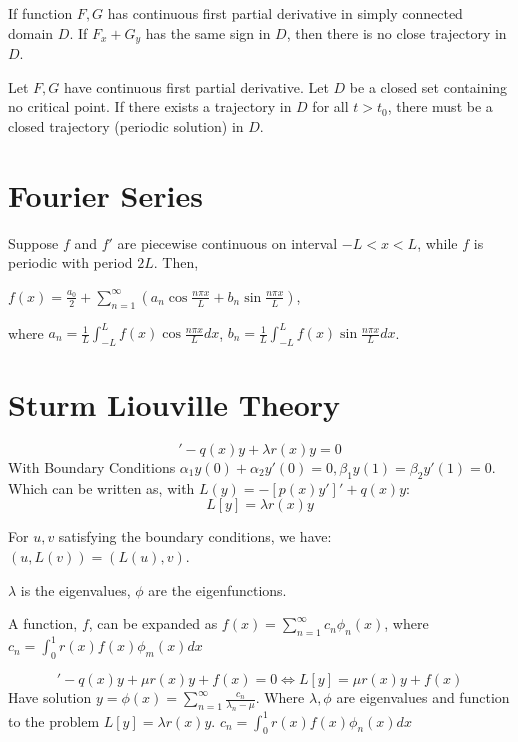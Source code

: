 \documentclass[12pt]{article}
\begin{document}
\begin{theorem}
If function $F, G$ has continuous first partial derivative in simply connected domain $D$. If $F_x + G_y$ has the same sign in $D$, then there is no close trajectory in $D$.
\end{theorem}

\begin{theorem}
	Let $F,G$ have continuous first partial derivative. Let $D$ be a closed set containing no critical point. If there exists a trajectory in $D$ for all $t>t_0$, there must be a closed trajectory (periodic solution) in $D$.
\end{theorem}

\section{Fourier Series}
\begin{theorem}
	Suppose $f$ and $f'$ are piecewise continuous on interval $-L < x < L$, while $f$ is periodic with period $2L$. Then,

	$f(x) = \frac{a_0}{2} + \sum_{n=1}^{\infty} (a_n \cos{\frac{n\pi x}{L}} + b_n \sin{\frac{n\pi x}{L}})$,

	where $a_n = \frac{1}{L} \int_{-L}^{L} f(x) \cos{\frac{n\pi x}{L}} dx$, $b_n = \frac{1}{L} \int_{-L}^{L} f(x) \sin{\frac{n\pi x}{L}} dx$.
\end{theorem}

\section{Sturm Liouville Theory}

\begin{theorem} 
	\begin{equation}
		[p(x)y']' - q(x)y + \lambda r(x) y = 0
	\end{equation}
	With Boundary Conditions $\alpha_1 y(0) + \alpha_2 y'(0) = 0, \beta_1 y(1) = \beta_2 y'(1) = 0$.
	Which can be written as, with $L(y) = -[p(x)y']' + q(x)y$:
	$$L[y] = \lambda r(x)y$$

	For $u,v$ satisfying the boundary conditions, we have: $(u, L(v)) = (L(u), v)$.

	$\lambda$ is the eigenvalues, $\phi$ are the eigenfunctions.

	A function, $f$, can be expanded as $f(x) = \sum_{n=1}^{\infty} c_n \phi_n(x)$, where $c_n = \int_0^1 r(x)f(x)\phi_m(x)dx$
\end{theorem}

\begin{theorem}
	\begin{equation}
		[p(x)y']' - q(x)y +  \mu r(x) y + f(x)= 0 \iff L[y] = \mu r(x) y + f(x)
	\end{equation}
	Have solution $y = \phi(x) = \sum^{\infty}_{n=1} \frac{c_n}{\lambda_n - \mu}$.
	Where $\lambda, \phi$ are eigenvalues and function to the problem $L[y] = \lambda r(x) y$. $c_n = \int_0^1 r(x)f(x)\phi_n(x)dx$
\end{theorem}
\end{document}
